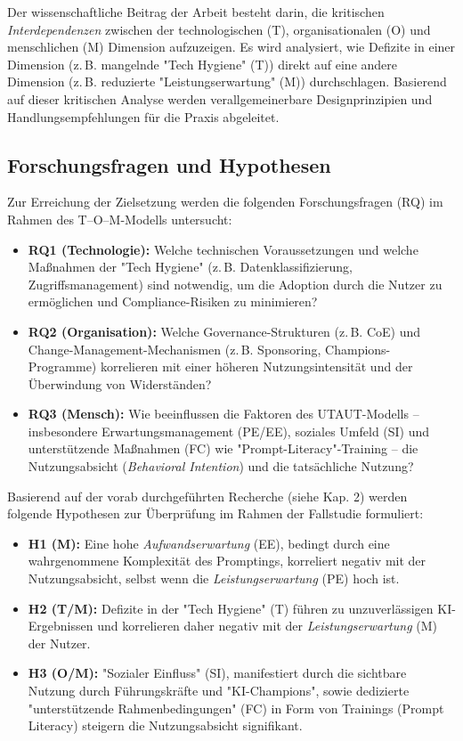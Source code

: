 \documentclass[12pt,a4paper,oneside]{article} %
\begin{document}
Der wissenschaftliche Beitrag der Arbeit besteht darin, die kritischen \textit{Interdependenzen} zwischen der technologischen (T), organisationalen (O) und menschlichen (M) Dimension aufzuzeigen. Es wird analysiert, wie Defizite in einer Dimension (z.\,B. mangelnde "Tech Hygiene" (T)) direkt auf eine andere Dimension (z.\,B. reduzierte "Leistungserwartung" (M)) durchschlagen. Basierend auf dieser kritischen Analyse werden verallgemeinerbare Designprinzipien und Handlungsempfehlungen für die Praxis abgeleitet.

\subsection{Forschungsfragen und Hypothesen}
Zur Erreichung der Zielsetzung werden die folgenden Forschungsfragen (RQ) im Rahmen des T–O–M-Modells untersucht:

\begin{itemize}
    \item \textbf{RQ1 (Technologie):} Welche technischen Voraussetzungen und welche Maßnahmen der "Tech Hygiene" (z.\,B. Datenklassifizierung, Zugriffsmanagement) sind notwendig, um die Adoption durch die Nutzer zu ermöglichen und Compliance-Risiken zu minimieren?
    \item \textbf{RQ2 (Organisation):} Welche Governance-Strukturen (z.\,B. CoE) und Change-Management-Mechanismen (z.\,B. Sponsoring, Champions-Programme) korrelieren mit einer höheren Nutzungsintensität und der Überwindung von Widerständen?
    \item \textbf{RQ3 (Mensch):} Wie beeinflussen die Faktoren des UTAUT-Modells – insbesondere Erwartungsmanagement (PE/EE), soziales Umfeld (SI) und unterstützende Maßnahmen (FC) wie "Prompt-Literacy"-Training – die Nutzungsabsicht (\textit{Behavioral Intention}) und die tatsächliche Nutzung?
\end{itemize}

Basierend auf der vorab durchgeführten Recherche (siehe Kap. 2) werden folgende Hypothesen zur Überprüfung im Rahmen der Fallstudie formuliert:

\begin{itemize}
    \item \textbf{H1 (M):} Eine hohe \textit{Aufwandserwartung} (EE), bedingt durch eine wahrgenommene Komplexität des Promptings, korreliert negativ mit der Nutzungsabsicht, selbst wenn die \textit{Leistungserwartung} (PE) hoch ist.
    \item \textbf{H2 (T/M):} Defizite in der "Tech Hygiene" (T) führen zu unzuverlässigen KI-Ergebnissen und korrelieren daher negativ mit der \textit{Leistungserwartung} (M) der Nutzer.
    \item \textbf{H3 (O/M):} "Sozialer Einfluss" (SI), manifestiert durch die sichtbare Nutzung durch Führungskräfte und "KI-Champions", sowie dedizierte "unterstützende Rahmenbedingungen" (FC) in Form von Trainings (Prompt Literacy) steigern die Nutzungsabsicht signifikant.
\end{itemize}
\end{document}
